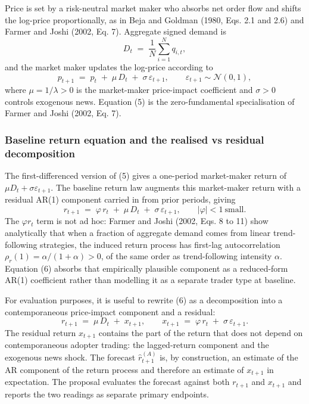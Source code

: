 \documentclass[11pt]{article}
\begin{document}
Price is set by a risk-neutral market maker who absorbs net order flow and shifts the log-price proportionally, as in Beja and Goldman (1980, Eqs. 2.1 and 2.6) and Farmer and Joshi (2002, Eq. 7). Aggregate signed demand is
\begin{equation}
  D_t \;=\; \frac{1}{N} \sum_{i=1}^{N} q_{i,t},
\end{equation}
and the market maker updates the log-price according to
\begin{equation}
  p_{t+1} \;=\; p_t \;+\; \mu\, D_t \;+\; \sigma\, \varepsilon_{t+1}, \qquad \varepsilon_{t+1} \sim \mathcal{N}(0, 1),
\end{equation}
where $\mu = 1/\lambda > 0$ is the market-maker price-impact coefficient and $\sigma > 0$ controls exogenous news. Equation (5) is the zero-fundamental specialisation of Farmer and Joshi (2002, Eq. 7).

\subsubsection{Baseline return equation and the realised vs residual decomposition}

The first-differenced version of (5) gives a one-period market-maker return of $\mu D_t + \sigma \varepsilon_{t+1}$. The baseline return law augments this market-maker return with a residual AR(1) component carried in from prior periods, giving
\begin{equation}
  r_{t+1} \;=\; \varphi\, r_t \;+\; \mu\, D_t \;+\; \sigma\, \varepsilon_{t+1}, \qquad |\varphi| < 1\ \text{small.}
\end{equation}
The $\varphi r_t$ term is not ad hoc: Farmer and Joshi (2002, Eqs. 8 to 11) show analytically that when a fraction of aggregate demand comes from linear trend-following strategies, the induced return process has first-lag autocorrelation $\rho_r(1) = \alpha / (1 + \alpha) > 0$, of the same order as trend-following intensity $\alpha$. Equation (6) absorbs that empirically plausible component as a reduced-form AR(1) coefficient rather than modelling it as a separate trader type at baseline.

For evaluation purposes, it is useful to rewrite (6) as a decomposition into a contemporaneous price-impact component and a residual:
\begin{equation}
  r_{t+1} \;=\; \mu\, D_t \;+\; x_{t+1}, \qquad x_{t+1} \;=\; \varphi\, r_t \;+\; \sigma\, \varepsilon_{t+1}.
\end{equation}
The residual return $x_{t+1}$ contains the part of the return that does not depend on contemporaneous adopter trading: the lagged-return component and the exogenous news shock. The forecast $\hat{r}_{t+1}^{(A)}$ is, by construction, an estimate of the AR component of the return process and therefore an estimate of $x_{t+1}$ in expectation. The proposal evaluates the forecast against both $r_{t+1}$ and $x_{t+1}$ and reports the two readings as separate primary endpoints.
\end{document}
